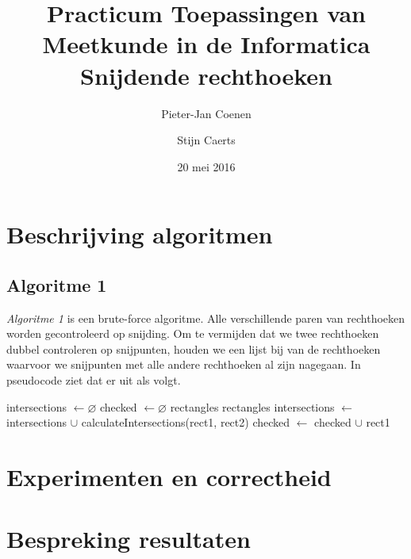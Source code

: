 \documentclass[11pt,a4paper,titlepage]{article}
\author{Pieter-Jan Coenen \and Stijn Caerts}
\title{Practicum Toepassingen van Meetkunde in de Informatica \\ Snijdende rechthoeken}
\date{20 mei 2016}
\begin{document}
	\maketitle
	\tableofcontents
	\newpage
	\section{Beschrijving algoritmen}
	\subsection{Algoritme 1}
	\emph{Algoritme 1} is een brute-force algoritme. Alle verschillende paren van rechthoeken worden gecontroleerd op snijding. Om te vermijden dat we twee rechthoeken dubbel controleren op snijpunten, houden we een lijst bij van de rechthoeken waarvoor we snijpunten met alle andere rechthoeken al zijn nagegaan. In pseudocode ziet dat er uit als volgt.
	\begin{algorithm}
		\caption{}
		\begin{algorithmic}[1]
			\State intersections $\gets \varnothing $
			\State checked $\gets \varnothing $
			 {rectangles}
				 {rectangles}
						\State intersections $ \gets $ intersections $ \cup $ calculateIntersections(rect1, rect2)
					\EndIf
				\EndForEach
				\State checked $\gets$ checked $\cup$ rect1
			\EndForEach
		\end{algorithmic}
	\end{algorithm}
	\section{Experimenten en correctheid}
	\section{Bespreking resultaten}
	
\end{document}
